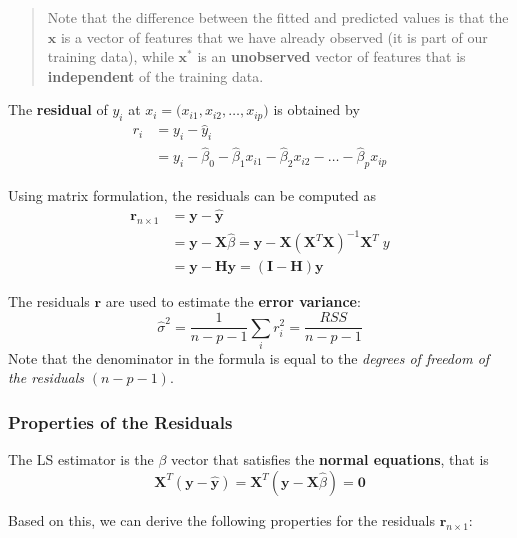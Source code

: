 \documentclass[
]{book}
\begin{document}
\begin{quote}
Note that the difference between the fitted and predicted values is that the \(\mathbf{x}\) is a vector of features that we have already observed (it is part of our training data), while \(\mathbf{x}^*\) is an \textbf{unobserved} vector of features that is \textbf{independent} of the training data.
\end{quote}

The \textbf{residual} of \(y_i\) at \(x_i = \bigl( x_{i1}, x_{i2}, \ldots , x_{ip}\bigr)\) is obtained by
\begin{align*}
r_{i} &= y_i - \hat{y}_i \\
&= y_i - \hat{\beta}_0 - \hat{\beta}_1 x_{i1} - \hat{\beta}_2 x_{i2} - \ldots - \hat{\beta}_p x_{ip}
\end{align*}

Using matrix formulation, the residuals can be computed as
\begin{align*}
\mathbf{r}_{n\times 1} &= \mathbf{y} - \hat{\mathbf{y}} \\
&= \mathbf{y} - \mathbf{X}\hat{\beta} = \mathbf{y} - \mathbf{X} (\mathbf{X}^T\mathbf{X})^{-1} \mathbf{X}^T\;  y \\
&= \mathbf{y} - \mathbf{H} \mathbf{y} = (\mathbf{I} -\mathbf{H}) \mathbf{y}
\end{align*}

The residuals \(\mathbf{r}\) are used to estimate the \textbf{error variance}:
\[\hat{\sigma}^2 = \frac{1}{n-p-1}\sum_i r_i^2 = \frac{RSS}{n-p-1}\]
Note that the denominator in the formula is equal to the \emph{degrees of freedom of the residuals} \((n-p-1)\).

\subsubsection*{Properties of the Residuals}\label{properties-of-the-residuals}

The LS estimator is the \(\beta\) vector that satisfies the \textbf{normal equations}, that is
\[\mathbf{X}^T (\mathbf{y} - \hat{\mathbf{y}}) = \mathbf{X}^T (\mathbf{y} - \mathbf{X}\hat{\beta}) = \mathbf{0}\]

Based on this, we can derive the following properties for the residuals \(\mathbf{r}_{n\times 1}\):
\end{document}
